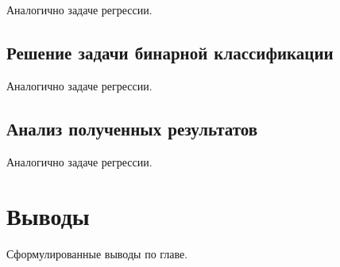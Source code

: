 Аналогично задаче регрессии.

\vspace{\baselineskip}\subsection{Решение задачи бинарной классификации}\vspace{\baselineskip}

Аналогично задаче регрессии.

\vspace{\baselineskip}\subsection{Анализ полученных результатов}\vspace{\baselineskip}

Аналогично задаче регрессии.

\vspace{\baselineskip}\section{Выводы}\vspace{\baselineskip}

Сформулированные выводы по главе.
